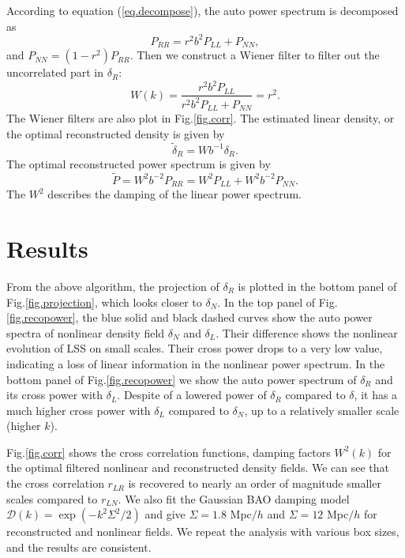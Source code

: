 \documentclass[aps,prd,twocolumn,superscriptaddress,amsfont,amssymb,amsmath,nofootinbib,showpacs,balancelastpage]{revtex4-1}
\begin{document}
According to equation (\ref{eq.decompose}), the auto power spectrum is decomposed as
\begin{equation}\label{eq.power}
    P_{RR}=r^2b^2P_{LL}+P_{NN},
\end{equation}
and $P_{NN}=(1-r^2)P_{RR}$. Then we construct a Wiener filter to filter out the uncorrelated part in $\delta_R$:
\begin{equation}
    W(k)=\frac{r^2b^2P_{LL}}{r^2b^2P_{LL}+P_{NN}}=r^2.
\end{equation}
The Wiener filters are also plot in Fig.\ref{fig.corr}. The estimated linear density, or the optimal reconstructed density is given by
\begin{equation}
    \tilde\delta_R=Wb^{-1}\delta_R.
\end{equation}
The optimal reconstructed power spectrum is given by
\begin{equation}\label{eq.opt}
    \tilde P=W^2b^{-2}P_{RR}=W^2P_{LL}+W^2b^{-2}P_{NN}.
\end{equation}
The $W^2$ describes the damping of the linear power spectrum.

\section{Results}\label{sec.results}

From the above algorithm, the projection of $\delta_R$ is plotted in
the bottom panel of Fig.\ref{fig.projection}, which looks closer to 
$\delta_N$. In the top panel of Fig.\ref{fig.recopower}, the blue solid and
black dashed curves show the auto power spectra of 
nonlinear density field $\delta_N$ and $\delta_L$. Their difference shows the nonlinear evolution of LSS on 
small scales. Their cross power drops to a very low value, indicating a loss of 
linear information in the nonlinear power spectrum.
In the bottom panel of Fig.\ref{fig.recopower} 
we show the auto power spectrum of $\delta_R$ and its cross power
with $\delta_L$. Despite of a lowered power of $\delta_R$ compared to $\delta$,
it has a much higher cross power with $\delta_L$ compared to $\delta_N$,
up to a relatively smaller scale (higher $k$).

Fig.\ref{fig.corr} shows the cross correlation functions,
damping factors $W^2(k)$ for the optimal filtered 
nonlinear and reconstructed density fields.
We can see that the cross correlation $r_{LR}$ is recovered to
nearly an order of magnitude smaller scales compared to $r_{LN}$.
We also fit the Gaussian BAO damping model $
{\mathcal D}(k)=\exp(-k^2\Sigma^2/2)$ and give $\Sigma=1.8$ Mpc$/h$ and $\Sigma=12$ 
Mpc$/h$ for reconstructed and nonlinear fields.
We repeat the analysis with various box sizes,
and the results are consistent.
\end{document}
